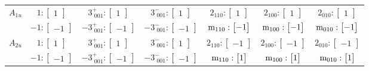 \documentclass[fleqn,8pt,landscape]{jsarticle}
\begin{document}
\begin{longtable}{ccccccc}
$ A_{1u} $ & $ 1:\begin{bmatrix} 1 \end{bmatrix} $ & $ 3^{+}_{\,\,001}:\begin{bmatrix} 1 \end{bmatrix} $ & $ 3^{-}_{\,\,001}:\begin{bmatrix} 1 \end{bmatrix} $ & $ 2{}_{110}:\begin{bmatrix} 1 \end{bmatrix} $ & $ 2{}_{100}:\begin{bmatrix} 1 \end{bmatrix} $ & $ 2{}_{010}:\begin{bmatrix} 1 \end{bmatrix} $ \\
& $ -1:\begin{bmatrix} -1 \end{bmatrix} $ & $ -3^{+}_{\,\,001}:\begin{bmatrix} -1 \end{bmatrix} $ & $ -3^{-}_{\,\,001}:\begin{bmatrix} -1 \end{bmatrix} $ & $ {\rm m}_{110}:\begin{bmatrix} -1 \end{bmatrix} $ & $ {\rm m}_{100}:\begin{bmatrix} -1 \end{bmatrix} $ & $ {\rm m}_{010}:\begin{bmatrix} -1 \end{bmatrix} $ \\ \hline
$ A_{2u} $ & $ 1:\begin{bmatrix} 1 \end{bmatrix} $ & $ 3^{+}_{\,\,001}:\begin{bmatrix} 1 \end{bmatrix} $ & $ 3^{-}_{\,\,001}:\begin{bmatrix} 1 \end{bmatrix} $ & $ 2{}_{110}:\begin{bmatrix} -1 \end{bmatrix} $ & $ 2{}_{100}:\begin{bmatrix} -1 \end{bmatrix} $ & $ 2{}_{010}:\begin{bmatrix} -1 \end{bmatrix} $ \\
& $ -1:\begin{bmatrix} -1 \end{bmatrix} $ & $ -3^{+}_{\,\,001}:\begin{bmatrix} -1 \end{bmatrix} $ & $ -3^{-}_{\,\,001}:\begin{bmatrix} -1 \end{bmatrix} $ & $ {\rm m}_{110}:\begin{bmatrix} 1 \end{bmatrix} $ & $ {\rm m}_{100}:\begin{bmatrix} 1 \end{bmatrix} $ & $ {\rm m}_{010}:\begin{bmatrix} 1 \end{bmatrix} $ \\ \hline

\end{longtable}
\end{document}
